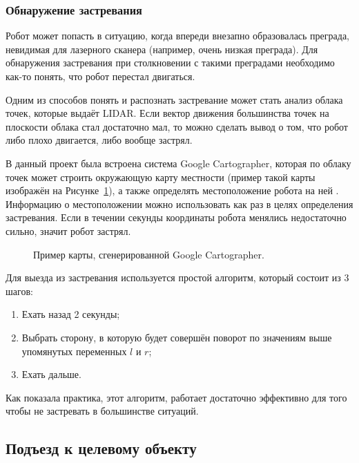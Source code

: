 \subsubsection{Обнаружение застревания}

Робот может попасть в ситуацию, когда впереди внезапно образовалась преграда, невидимая для лазерного сканера (например, очень низкая преграда). Для обнаружения застревания при столкновении с такими преградами необходимо как-то понять, что робот перестал двигаться. 

Одним из способов понять и распознать застревание может стать анализ облака точек, которые выдаёт LIDAR. Если вектор движения большинства точек на плоскости облака стал достаточно мал, то можно сделать вывод о том, что робот либо плохо двигается, либо вообще застрял. 

В данный проект была встроена система Google Cartographer, которая по облаку точек может строить окружающую карту местности (пример такой карты изображён на Рисунке~\ref{fig:cartographer-example}), а также определять местоположение робота на ней . Информацию о местоположении можно использовать как раз в целях определения застревания. Если в течении секунды координаты робота менялись недостаточно сильно, значит робот застрял.

\begin{figure}[ht]
  \caption{Пример карты, сгенерированной Google Cartographer.}\label{fig:cartographer-example}
\end{figure}

Для выезда из застревания используется простой алгоритм, который состоит из 3 шагов:

\begin{enumerate}
\item Ехать назад 2 секунды;
\item Выбрать сторону, в которую будет совершён поворот по значениям выше упомянутых переменных $l$ и $r$;
\item Ехать дальше.
\end{enumerate}

Как показала практика, этот алгоритм, работает достаточно эффективно для того чтобы не застревать в большинстве ситуаций.

\subsection{Подъезд к целевому объекту}

